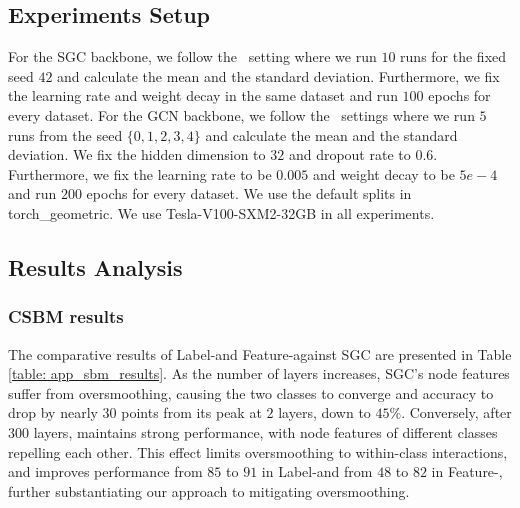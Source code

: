 % 


\subsection{Experiments Setup}
\label{app: setup}
For the SGC backbone, we follow the~\cite{dgc} setting where we run $10$ runs for the fixed seed $42$ and calculate the mean and the standard deviation. 
Furthermore, we fix the learning rate and weight decay in the same dataset and run $100$ epochs for every dataset. 
For the GCN backbone, we follow the~\cite{contranorm} settings where we run $5$ runs from the seed $\{0,1,2,3,4\}$ and calculate the mean and the standard deviation. We fix the hidden dimension to $32$ and dropout rate to $0.6$.
Furthermore, we fix the learning rate to be $0.005$ and weight decay to be $5e-4$ and run $200$ epochs for every dataset. 
We use the default splits in torch\_geometric.
We use Tesla-V100-SXM2-32GB in all experiments.



\subsection{Results Analysis}


\subsubsection{CSBM results}
The comparative results of Label-\ours and Feature-\ours against SGC are presented in Table \ref{table: app_sbm_results}. 
As the number of layers increases, SGC's node features suffer from oversmoothing, causing the two classes to converge and accuracy to drop by nearly $30$ points from its peak at $2$ layers, down to $45\%$. 
Conversely, after $300$ layers, \ours maintains strong performance, with node features of different classes repelling each other. 
This effect limits oversmoothing to within-class interactions, and improves performance from $85$ to $91$ in Label-\ours and from $48$ to $82$ in Feature-\ours, further substantiating our approach to mitigating oversmoothing.

